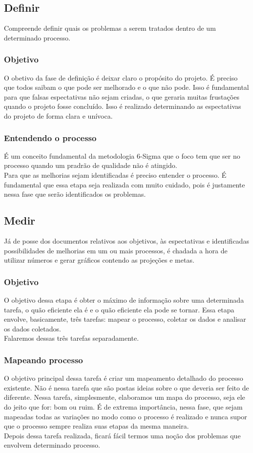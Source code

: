 \documentclass{abnt}
\begin{document}
				\subsection {Definir}
					Compreende definir quais os problemas a serem tratados dentro de um determinado processo.
					\subsubsection {Objetivo}
					O obetivo da fase de definição é deixar claro o propósito do projeto. É preciso que todos
					saibam o que pode ser melhorado e o que não pode. Isso é fundamental para que falsas espectativas 
					não sejam criadas, o que geraria muitas frustações quando o projeto fosse concluído. Isso é 
					realizado determinando as espectativas do projeto de forma clara e unívoca.
					\subsubsection {Entendendo o processo}
					É um conceito fundamental da metodologia 6-Sigma que o foco tem que ser no processo
					quando um pradrão de qualidade não é atingido.\\
					Para que as melhorias sejam identificadas é preciso entender o processo.  
					É fundamental que essa etapa seja realizada com muito cuidado, pois é justamente nessa
					fase que serão identificados os problemas.
				\subsection {Medir}
					Já de posse dos documentos relativos aos objetivos, às espectativas e identificadas 
					possibilidades de melhorias em um ou mais processos, é chadada a hora de utilizar números 
					e gerar gráficos contendo as projeções e metas.
					\subsubsection {Objetivo}
					O objetivo dessa etapa é obter o máximo de informação sobre uma determinada tarefa, 
					o quão eficiente ela é e o quão eficiente ela pode se tornar. Essa etapa envolve, 
					basicamente, três tarefas: mapear o processo, coletar os dados e analisar os dados coletados.
					\\
					Falaremos dessas três tarefas separadamente.
					\subsubsection {Mapeando processo}
					O objetivo principal dessa tarefa é criar um mapeamento detalhado do processo existente.
					Não é nessa tarefa que são postas ideias sobre o que deveria ser feito de diferente. 
					Nessa tarefa, simplesmente, elaboramos um mapa do processo, seja ele do jeito que for: bom ou ruim.
					É de extrema importância, nessa fase, que sejam mapeadas todas as variações no modo como o processo é realizado e 
					nunca supor que o processo sempre realiza suas etapas da mesma maneira.
					\\
					Depois dessa tarefa realizada, ficará fácil termos uma noção dos problemas que envolvem determinado processo.
\end{document}
